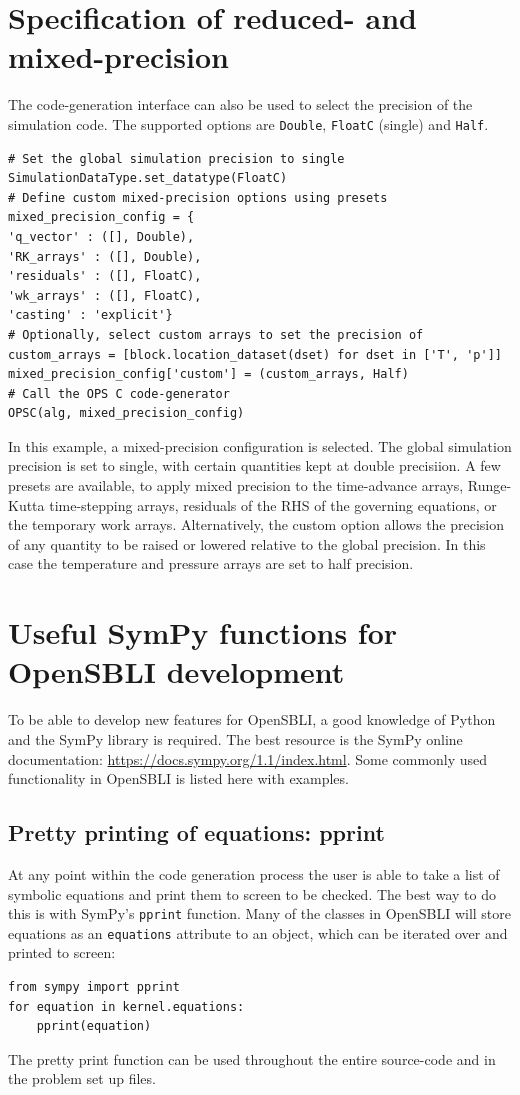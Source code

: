 \documentclass[11pt]{article}
\begin{document}
\newpage
\section{Specification of reduced- and mixed-precision}
The code-generation interface can also be used to select the precision of the simulation code. The supported options are \verb|Double|, \verb|FloatC| (single) and \verb|Half|.

\begin{lstlisting}
# Set the global simulation precision to single
SimulationDataType.set_datatype(FloatC)
# Define custom mixed-precision options using presets
mixed_precision_config = {
'q_vector' : ([], Double),
'RK_arrays' : ([], Double),
'residuals' : ([], FloatC),
'wk_arrays' : ([], FloatC),
'casting' : 'explicit'}
# Optionally, select custom arrays to set the precision of
custom_arrays = [block.location_dataset(dset) for dset in ['T', 'p']]
mixed_precision_config['custom'] = (custom_arrays, Half)
# Call the OPS C code-generator 
OPSC(alg, mixed_precision_config)
\end{lstlisting}
In this example, a mixed-precision configuration is selected. The global simulation precision is set to single, with certain quantities kept at double precisiion. A few presets are available, to apply mixed precision to the time-advance arrays, Runge-Kutta time-stepping arrays, residuals of the RHS of the governing equations, or the temporary work arrays. Alternatively, the custom option allows the precision of any quantity to be raised or lowered relative to the global precision. In this case the temperature and pressure arrays are set to half precision.

\newpage
\section{Useful SymPy functions for OpenSBLI development}
To be able to develop new features for OpenSBLI, a good knowledge of Python and the SymPy library is required. The best resource is the SymPy online documentation: \url{https://docs.sympy.org/1.1/index.html}. Some commonly used functionality in OpenSBLI is listed here with examples.

\subsection{Pretty printing of equations: pprint}
At any point within the code generation process the user is able to take a list of symbolic equations and print them to screen to be checked. The best way to do this is with SymPy's \verb|pprint| function. Many of the classes in OpenSBLI will store equations as an \verb|equations| attribute to an object, which can be iterated over and printed to screen:
\begin{lstlisting}
from sympy import pprint
for equation in kernel.equations:
	pprint(equation)
\end{lstlisting}
The pretty print function can be used throughout the entire source-code and in the problem set up files.
\end{document}
